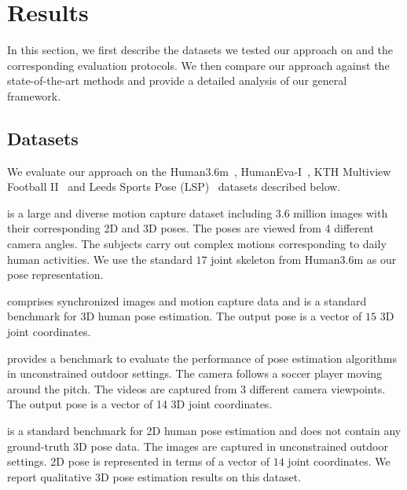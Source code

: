 

\section{Results}
\label{sec:results}

In this section, we first describe the datasets we tested our approach on and the corresponding 
evaluation protocols. We then compare our approach against the state-of-the-art methods and provide 
a detailed analysis of our general framework.

\subsection{Datasets}
\label{ssec:datasets}

We evaluate our  approach on the Human3.6m~\cite{Ionescu14a}, HumanEva-I~\cite{Sigal06}, KTH Multiview
Football II~\cite{Burenius13} and Leeds Sports Pose (LSP)~\cite{Johnson10b} datasets described below.

 is a large and diverse motion capture dataset including  3.6 
million  images  with  their corresponding 2D  and 3D  poses. The  poses are viewed  from 4  different 
camera angles. The  subjects carry out  complex motions corresponding to  daily human activities.
 We  use the standard $17$ joint skeleton from Human3.6m as our pose representation.

 comprises synchronized images and motion capture data and is a  standard 
benchmark for 3D human pose  estimation. The output pose is a vector of $15$ 3D joint coordinates.

 provides a benchmark to evaluate the performance of pose 
estimation algorithms in unconstrained outdoor settings. The camera follows a soccer player moving 
around the pitch. The videos are captured from 3 different camera viewpoints. The output pose is a vector of 14 3D joint coordinates.

 is a standard benchmark for 2D human pose estimation and does
not contain any ground-truth 3D pose data. The images are captured in unconstrained
outdoor settings. 2D pose is represented in terms of a vector of $14$ joint coordinates.
We report qualitative 3D pose estimation results on this dataset.


